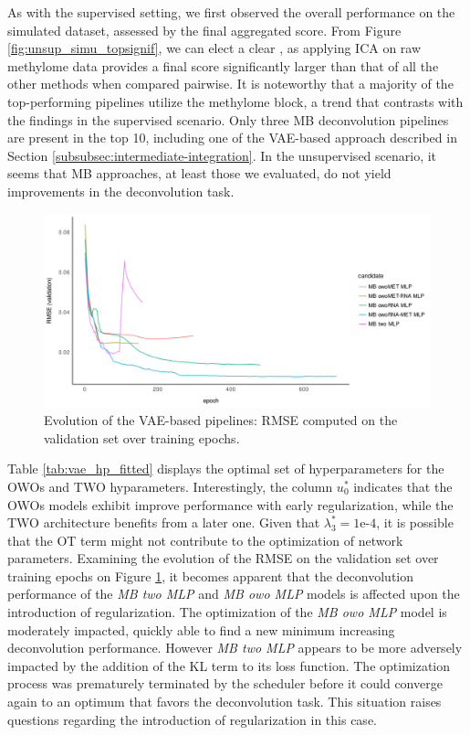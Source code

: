 \documentclass{article}
\begin{document}
As with the supervised setting, we first observed the overall performance on the simulated dataset, assessed by the final aggregated score.
From Figure \ref{fig:unsup_simu_topsignif}, we can elect a clear , as applying ICA on raw methylome data provides a final score significantly larger than that of all the other methods when compared pairwise.
It is noteworthy that a majority of the top-performing pipelines utilize the methylome block, a trend that contrasts with the findings in the supervised scenario.
Only three MB deconvolution pipelines are present in the top 10, including one of the VAE-based approach described in Section \ref{subsubsec:intermediate-integration}.
In the unsupervised scenario, it seems that MB approaches, at least those we evaluated, do not yield improvements in the deconvolution task.



\begin{figure}[htb]
    \centering
    \includegraphics[width=\textwidth,keepaspectratio]{fig/vae_val_rmse.png}
    \caption{Evolution of the VAE-based pipelines: RMSE computed on the validation set over training epochs.}
    \label{fig:vae_val_rmse}
\end{figure}

Table \ref{tab:vae_hp_fitted} displays the optimal set of hyperparameters for the OWOs and TWO hyparameters.
Interestingly, the column $u_0^*$ indicates that the OWOs models exhibit improve performance with early regularization, while the TWO architecture benefits from a later one.
Given that $\lambda_3^*=\text{1e-4}$, it is possible that the OT term might not contribute to the optimization of network parameters.
Examining the evolution of the RMSE on the validation set over training epochs on Figure \ref{fig:vae_val_rmse}, it becomes apparent that the deconvolution performance of the \textit{MB two MLP} and \textit{MB owo MLP} models is affected upon the introduction of regularization.
The optimization of the \textit{MB owo MLP} model is moderately impacted, quickly able to find a new minimum increasing deconvolution performance.
However \textit{MB two MLP} appears to be more adversely impacted by the addition of the KL term to its loss function.
The optimization process was prematurely terminated by the scheduler before it could converge again to an optimum that favors the deconvolution task.
This situation raises questions regarding the introduction of regularization in this case.
\end{document}
